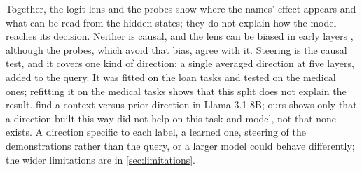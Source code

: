 Together, the logit lens and the probes show where the names' effect appears and what can be read from the hidden states; they do not explain how the model reaches its decision.
Neither is causal, and the lens can be biased in early layers \citep{belrose2023eliciting}, although the probes, which avoid that bias, agree with it.
Steering is the causal test, and it covers one kind of direction: a single averaged direction at five layers, added to the query.
It was fitted on the loan tasks and tested on the medical ones; refitting it on the medical tasks shows that this split does not explain the result.
\citet{minder2025controllable} find a context-versus-prior direction in Llama-3.1-8B; ours shows only that a direction built this way did not help on this task and model, not that none exists.
A direction specific to each label, a learned one, steering of the demonstrations rather than the query, or a larger model could behave differently; the wider limitations are in \autoref{sec:limitations}.
